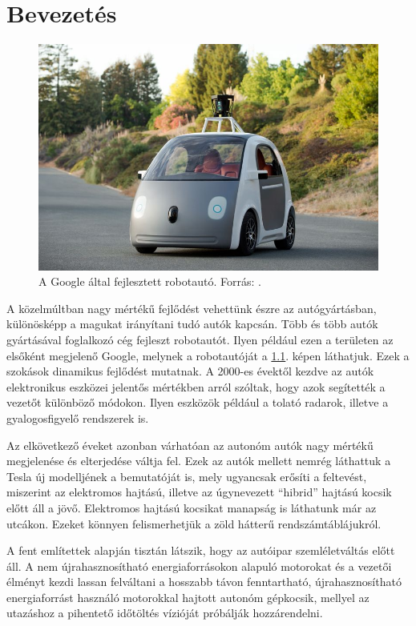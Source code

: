 \documentclass[a4paper,12pt]{report}
\begin{document}
\chapter{Bevezetés}

\begin{figure}[h]
\centerline{
\includegraphics[width=6in]{img/googleauto}}
\caption{A Google által fejlesztett robotautó. Forrás: \cite{googlecarimage}.}
\label{googleauto}
\end{figure}

A közelmúltban nagy mértékű fejlődést vehettünk észre az autógyártásban, különösképp a magukat irányítani tudó autók kapcsán. Több és több autók gyártásával foglalkozó cég fejleszt robotautót. Ilyen például ezen a területen az elsőként megjelenő Google, melynek a robotautóját a \ref{googleauto}. képen láthatjuk. Ezek a szokások dinamikus fejlődést mutatnak. A 2000-es évektől kezdve az autók elektronikus eszközei jelentős mértékben arról szóltak, hogy azok segítették a vezetőt különböző módokon. Ilyen eszközök például a tolató radarok, illetve a gyalogosfigyelő rendszerek is. 

\vspace{2mm}
Az elkövetkező éveket azonban várhatóan az autonóm autók nagy mértékű megjelenése és elterjedése váltja fel. Ezek az autók mellett nemrég láthattuk a Tesla új modelljének a bemutatóját is, mely ugyancsak erősíti a feltevést, miszerint az elektromos hajtású, illetve az úgynevezett ``hibrid'' hajtású kocsik előtt áll a jövő. Elektromos hajtású kocsikat manapság is láthatunk már az utcákon. Ezeket könnyen felismerhetjük a zöld hátterű rendszámtáblájukról.

\vspace{2mm}
A fent említettek alapján tisztán látszik, hogy az autóipar szemléletváltás előtt áll. A nem újrahasznosítható energiaforrásokon alapuló motorokat és a vezetői élményt kezdi lassan felváltani a hosszabb távon fenntartható, újrahasznosítható energiaforrást használó motorokkal hajtott autonóm gépkocsik, mellyel az utazáshoz a pihentető időtöltés vízióját próbálják hozzárendelni.
\end{document}
